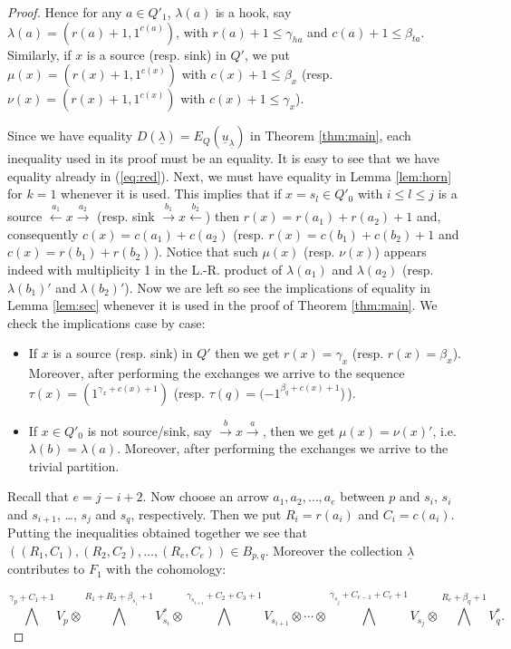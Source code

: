 \documentclass[twoside]{article}
\newcommand{\und}{\underline}
\theoremstyle{definition}
\begin{document}
\begin{proof}
\vspace{0.05in}

Hence for any $a\in Q'_1$, $\lambda(a)$ is a hook, say $\lambda(a)=(r(a)+1,1^{c(a)})$, with $r(a)+1\leq \gamma_{ha}$ and $c(a)+1\leq \beta_{ta}$. Similarly, if $x$ is a source (resp. sink) in $Q'$, we put $\mu(x)=(r(x)+1,1^{c(x)})$ with $c(x)+1\leq \beta_x$ (resp. $\nu(x)=(r(x)+1,1^{c(x)})$ with $c(x)+1\leq \gamma_x$).

\vspace{0.05in}

Since we have equality $D(\underline{\lambda})=E_Q(\underline{u}_{\underline{\lambda}})$ in Theorem \ref{thm:main}, each inequality used in its proof must be an equality. It is easy to see that we have equality already in (\ref{eq:red}). Next, we must have equality in Lemma \ref{lem:horn} for $k=1$ whenever it is used. This implies that if $x=s_l\in Q'_0$ with $i\leq l\leq j$ is a source $\xleftarrow{a_1} x \xrightarrow{a_2}$ (resp. sink $\xrightarrow{b_1} x \xleftarrow{b_2}$) then $r(x)= r(a_1)+r(a_2)+1$ and, consequently $c(x)=c(a_1)+c(a_2)$ (resp. $r(x)=c(b_1)+c(b_2)+1$ and $c(x)=r(b_1)+r(b_2)$\,). Notice that such $\mu(x)$ (resp. $\nu(x)$) appears indeed with multiplicity 1 in the L.-R. product of $\lambda(a_1)$ and $\lambda(a_2)$ (resp. $\lambda(b_1)'$ and $\lambda(b_2)'$). Now we are left so see the implications of equality in Lemma \ref{lem:sec} whenever it is used in the proof of Theorem \ref{thm:main}. We check the implications case by case:
\begin{itemize} 
\item If $x$ is a source (resp. sink) in $Q'$ then we get $r(x)=\gamma_x$ (resp. $r(x)=\beta_x$). Moreover, after performing the exchanges we arrive to the sequence $\tau(x)=(1^{\gamma_x+c(x)+1})$ (resp. $\tau(q)=(-1^{\beta_q+c(x)+1}$)\,).
\item If $x\in Q'_0$ is not source/sink, say $\xrightarrow{b} x \xrightarrow{a}$, then we get $\mu(x)=\nu(x)'$, i.e. $\lambda(b)=\lambda(a)$. Moreover, after performing the exchanges we arrive to the trivial partition.
\end{itemize}
Recall that $e=j-i+2$. Now choose an arrow $a_1,a_2,\dots,a_e$ between $p$ and $s_i$, $s_i$ and $s_{i+1}$, \dots, $s_j$ and $s_{q}$, respectively. Then we put $R_i = r(a_i)$ and $C_i=c(a_i)$. Putting the inequalities obtained together we see that $((R_1,C_1),(R_2,C_2),\dots,(R_e,C_e))\in B_{p,q}$. Moreover the collection $\und{\lambda}$ contributes to $F_1$ with the cohomology:

 $$\bigwedge^{\gamma_p+C_1+1}\!\! V_{p}\otimes \!\!\!\! \bigwedge^{{R_1+R_2+\beta_{s_i}+1}}\!\!\! V_{s_i}^*\otimes \!\!\!\! \bigwedge^{\gamma_{s_{i+1}}+C_2+C_3+1}\!\!\!V_{s_{i+1}}\otimes\cdots\otimes\!\!\!\!\! \bigwedge^{\gamma_{s_j}+C_{e-1}+C_e+1}\!\!\! V_{s_j} \otimes\!\! \bigwedge^{R_e+\beta_q+1}\!\!V_{q}^*.$$


\end{proof}
\end{document}

